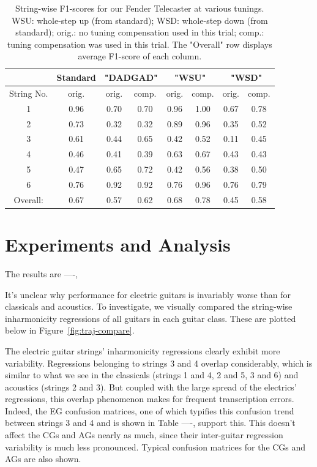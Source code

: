 \documentclass[12pt]{cmuthesis}
\begin{document}
\begin{table}
\begin{center}
\begin{tabular}{||c||c||c|c||c|c||c|c||}
\hline
& Standard & \multicolumn{2}{|c|}{"DADGAD"} & \multicolumn{2}{|c|}{"WSU"} & \multicolumn{2}{|c|}{"WSD"} \\
\hline
String No. & orig. & orig. & comp. & orig. & comp. & orig. & comp. \\
\hline
1 & 0.96 & 0.70 & 0.70 & 0.96 & 1.00 & 0.67 & 0.78 \\
\hline
2 & 0.73 & 0.32 & 0.32 & 0.89 & 0.96 & 0.35 & 0.52\\
\hline
3 & 0.61 & 0.44 & 0.65 & 0.42 & 0.52 & 0.11 & 0.45\\
\hline
4 & 0.46 & 0.41 & 0.39 & 0.63 & 0.67 & 0.43 & 0.43 \\
\hline
5 & 0.47 & 0.65 & 0.72 & 0.42 & 0.56 & 0.38 & 0.50 \\
\hline
6 & 0.76 & 0.92 & 0.92 & 0.76 & 0.96 & 0.76 & 0.79\\ 
\hline
\hline
Overall: & 0.67 & 0.57 & 0.62 & 0.68 & 0.78 & 0.45 & 0.58 \\
\hline
\end{tabular}
\caption{String-wise F1-scores for our Fender Telecaster at various tunings. WSU: whole-step up (from standard); WSD: whole-step down (from standard); orig.: no tuning compensation used in this trial; comp.: tuning compensation was used in this trial. The "Overall" row displays average F1-score of each column.} 
\label{tab:resultsTune}
\end{center}
\end{table}


\noindent
\chapter{Experiments and Analysis}
The results are ----, 

It's unclear why performance for electric guitars is invariably worse than for classicals and acoustics. To investigate, we visually compared the string-wise inharmonicity regressions of all guitars in each guitar class. These are plotted below in Figure~\ref{fig:traj-compare}.

The electric guitar strings' inharmonicity regressions clearly exhibit more variability. Regressions belonging to strings 3 and 4 overlap considerably, which is similar to what we see in the classicals (strings 1 and 4, 2 and 5, 3 and 6) and acoustics (strings 2 and 3). But coupled with the large spread of the electrics' regressions, this overlap phenomenon makes for frequent transcription errors. Indeed, the EG confusion matrices, one of which typifies this confusion trend between strings 3 and 4 and is shown in Table ----, support this. This doesn't affect the CGs and AGs nearly as much, since their inter-guitar regression variability is much less pronounced. Typical confusion matrices for the CGs and AGs are also shown.
\end{document}
